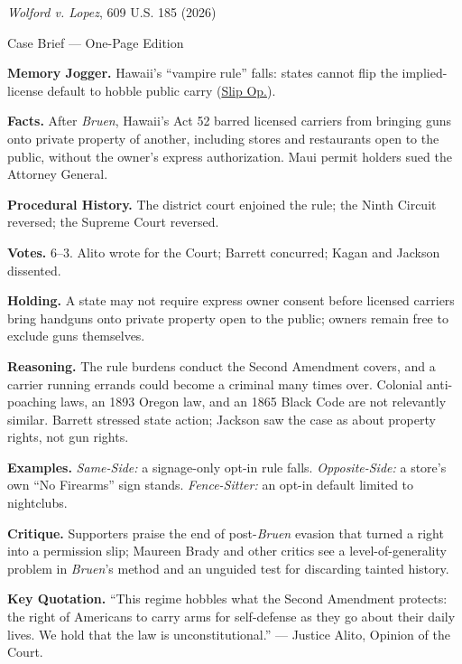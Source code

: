 \documentclass[12pt]{article}
\begin{document}
\begin{center}
{\Large \textit{Wolford v. Lopez}, 609 U.S. 185 (2026)\par}
\vspace{0.3em}
{\normalsize Case Brief --- One-Page Edition\par}
\end{center}

\textbf{Memory Jogger.} Hawaii's ``vampire rule'' falls: states cannot flip the implied-license default to hobble public carry (\href{https://www.supremecourt.gov/opinions/25pdf/24-1046_nmio.pdf}{Slip Op.}).

\textbf{Facts.} After \textit{Bruen}, Hawaii's Act 52 barred licensed carriers from bringing guns onto private property of another, including stores and restaurants open to the public, without the owner's express authorization. Maui permit holders sued the Attorney General.

\textbf{Procedural History.} The district court enjoined the rule; the Ninth Circuit reversed; the Supreme Court reversed.

\textbf{Votes.} 6--3. Alito wrote for the Court; Barrett concurred; Kagan and Jackson dissented.

\textbf{Holding.} A state may not require express owner consent before licensed carriers bring handguns onto private property open to the public; owners remain free to exclude guns themselves.

\textbf{Reasoning.} The rule burdens conduct the Second Amendment covers, and a carrier running errands could become a criminal many times over. Colonial anti-poaching laws, an 1893 Oregon law, and an 1865 Black Code are not relevantly similar. Barrett stressed state action; Jackson saw the case as about property rights, not gun rights.

\textbf{Examples.} \emph{Same-Side:} a signage-only opt-in rule falls. \emph{Opposite-Side:} a store's own ``No Firearms'' sign stands. \emph{Fence-Sitter:} an opt-in default limited to nightclubs.

\textbf{Critique.} Supporters praise the end of post-\textit{Bruen} evasion that turned a right into a permission slip; Maureen Brady and other critics see a level-of-generality problem in \textit{Bruen}'s method and an unguided test for discarding tainted history.

\textbf{Key Quotation.} ``This regime hobbles what the Second Amendment protects: the right of Americans to carry arms for self-defense as they go about their daily lives. We hold that the law is unconstitutional.'' --- Justice Alito, Opinion of the Court.
\end{document}
